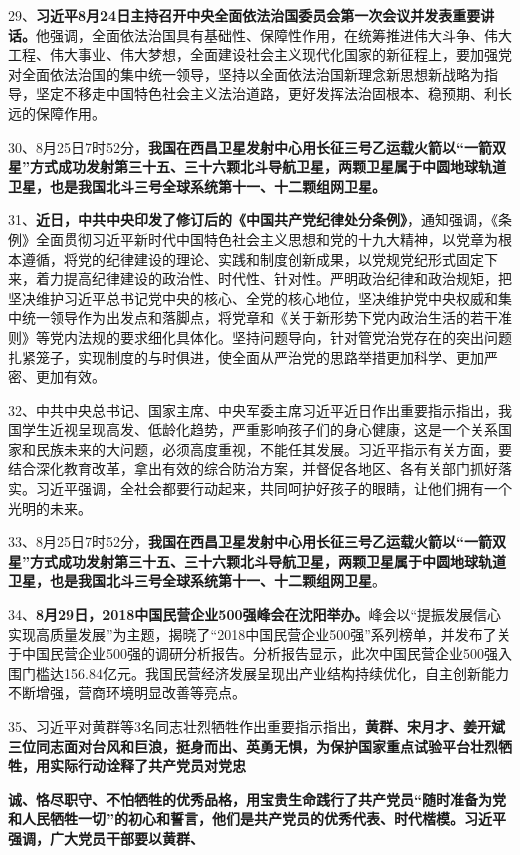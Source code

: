 29、{\textbf{习近平8月24日主持召开中央全面依法治国委员会第一次会议并发表重要讲话。}}他强调，全面依法治国具有基础性、保障性作用，在统筹推进伟大斗争、伟大工程、伟大事业、伟大梦想，全面建设社会主义现代化国家的新征程上，要加强党对全面依法治国的集中统一领导，坚持以全面依法治国新理念新思想新战略为指导，坚定不移走中国特色社会主义法治道路，更好发挥法治固根本、稳预期、利长远的保障作用。

30、8月25日7时52分，{\textbf{我国在西昌卫星发射中心用长征三号乙运载火箭以``一箭双星''方式成功发射第三十五、三十六颗北斗导航卫星，两颗卫星属于中圆地球轨道卫星，也是我国北斗三号全球系统第十一、十二颗组网卫星。}}

31、{\textbf{近日，中共中央印发了修订后的《中国共产党纪律处分条例》}}，通知强调，《条例》全面贯彻习近平新时代中国特色社会主义思想和党的十九大精神，以党章为根本遵循，将党的纪律建设的理论、实践和制度创新成果，以党规党纪形式固定下来，着力提高纪律建设的政治性、时代性、针对性。严明政治纪律和政治规矩，把坚决维护习近平总书记党中央的核心、全党的核心地位，坚决维护党中央权威和集中统一领导作为出发点和落脚点，将党章和《关于新形势下党内政治生活的若干准则》等党内法规的要求细化具体化。坚持问题导向，针对管党治党存在的突出问题扎紧笼子，实现制度的与时俱进，使全面从严治党的思路举措更加科学、更加严密、更加有效。

32、中共中央总书记、国家主席、中央军委主席习近平近日作出重要指示指出，我国学生近视呈现高发、低龄化趋势，严重影响孩子们的身心健康，这是一个关系国家和民族未来的大问题，必须高度重视，不能任其发展。习近平指示有关方面，要结合深化教育改革，拿出有效的综合防治方案，并督促各地区、各有关部门抓好落实。习近平强调，全社会都要行动起来，共同呵护好孩子的眼睛，让他们拥有一个光明的未来。

33、8月25日7时52分，{\textbf{我国在西昌卫星发射中心用长征三号乙运载火箭以``一箭双星''方式成功发射第三十五、三十六颗北斗导航卫星，两颗卫星属于中圆地球轨道卫星，也是我国北斗三号全球系统第十一、十二颗组网卫星}}。

34、{\textbf{8月29日，2018中国民营企业500强峰会在沈阳举办。}}峰会以``提振发展信心实现高质量发展''为主题，揭晓了``2018中国民营企业500强''系列榜单，并发布了关于中国民营企业500强的调研分析报告。分析报告显示，此次中国民营企业500强入围门槛达156.84亿元。我国民营经济发展呈现出产业结构持续优化，自主创新能力不断增强，营商环境明显改善等亮点。

35、习近平对黄群等3名同志壮烈牺牲作出重要指示指出，\textbf{{黄群、宋月才、姜开斌三位同志面对台风和巨浪，挺身而出、英勇无惧，为保护国家重点试验平台壮烈牺牲，用实际行动诠释了共产党员对党忠}}

\textbf{{诚、恪尽职守、不怕牺牲的优秀品格，用宝贵生命践行了共产党员``随时准备为党和人民牺牲一切''的初心和誓言，他们是共产党员的优秀代表、时代楷模。习近平强调，广大党员干部要以黄群、}}

